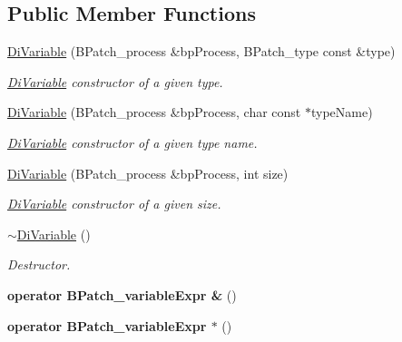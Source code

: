 \subsection*{Public Member Functions}
\begin{DoxyCompactItemize}
\item 
\hyperlink{class_di_variable_a909e93bc0684f53588b2875c2f6fc3aa}{Di\-Variable} (B\-Patch\-\_\-process \&bp\-Process, B\-Patch\-\_\-type const \&type)
\begin{DoxyCompactList}\small\item\em \hyperlink{class_di_variable}{Di\-Variable} constructor of a given type. \end{DoxyCompactList}\item 
\hyperlink{class_di_variable_ac9b7545cae8d71421296b9e076cb5a42}{Di\-Variable} (B\-Patch\-\_\-process \&bp\-Process, char const $\ast$type\-Name)
\begin{DoxyCompactList}\small\item\em \hyperlink{class_di_variable}{Di\-Variable} constructor of a given type name. \end{DoxyCompactList}\item 
\hyperlink{class_di_variable_ad94dd879a61ffba2dfd3339602ac8d81}{Di\-Variable} (B\-Patch\-\_\-process \&bp\-Process, int size)
\begin{DoxyCompactList}\small\item\em \hyperlink{class_di_variable}{Di\-Variable} constructor of a given size. \end{DoxyCompactList}\item 
\hypertarget{class_di_variable_aacef58e456bbf5a5f74ec678859d4845}{\hyperlink{class_di_variable_aacef58e456bbf5a5f74ec678859d4845}{$\sim$\-Di\-Variable} ()}\label{class_di_variable_aacef58e456bbf5a5f74ec678859d4845}

\begin{DoxyCompactList}\small\item\em Destructor. \end{DoxyCompactList}\item 
\hypertarget{class_di_variable_a06fa020320e2d8852594f17605563522}{{\bfseries operator B\-Patch\-\_\-variable\-Expr \&} ()}\label{class_di_variable_a06fa020320e2d8852594f17605563522}

\item 
\hypertarget{class_di_variable_a8fd67253e046796a14afa17ced1b894c}{{\bfseries operator B\-Patch\-\_\-variable\-Expr $\ast$} ()}\label{class_di_variable_a8fd67253e046796a14afa17ced1b894c}


\end{DoxyCompactItemize}
